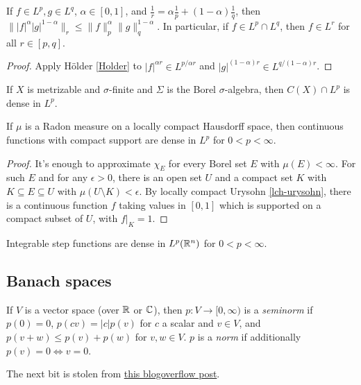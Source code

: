 \begin{prop} If $f \in L^p, g \in L^q$, $\alpha \in [0,1]$, and $\frac{1}{r} = \alpha \frac{1}{p} + (1-\alpha) \frac{1}{q}$, then $\||f|^{\alpha}|g|^{1-\alpha}\|_r \le \|f\|_p^{\alpha}\|g\|_q^{1-\alpha}$. In particular, if $f \in L^p\cap L^q$, then $f \in L^r$ for all $r \in [p,q]$.
\end{prop}
\begin{proof} Apply H\"older \ref{Holder} to $|f|^{\alpha r} \in L^{p/\alpha r}$ and $|g|^{(1-\alpha)r} \in L^{q/(1-\alpha)r}$.
\end{proof}

\begin{prop} If $X$ is metrizable and $\sigma$-finite and $\Sigma$ is the Borel $\sigma$-algebra, then $C(X) \cap L^p$ is dense in $L^p$.
\end{prop}

\begin{prop} If $\mu$ is a Radon measure on a locally compact Hausdorff space, then continuous functions with compact support are dense in $L^p$ for $0 < p < \infty$.
\end{prop}
\begin{proof} It's enough to approximate $\chi_E$ for every Borel set $E$ with $\mu(E) < \infty$. For such $E$ and for any $\epsilon > 0$, there is an open set $U$ and a compact set $K$ with $K \subseteq E \subseteq U$ with $\mu(U\setminus K) < \epsilon$. By locally compact Urysohn \ref{lch-urysohn}, there is a continuous function $f$ taking values in $[0,1]$ which is supported on a compact subset of $U$, with $f|_K = 1$.
\end{proof}

\begin{cor} Integrable step functions are dense in $L^p(\mathbb{R}^n)$ for $0 < p < \infty$.
\end{cor}


\subsection{Banach spaces}

\begin{defn} If $V$ is a vector space (over $\mathbb{R}$ or $\mathbb{C}$), then $p:V \rightarrow [0,\infty)$ is a \emph{seminorm} if $p(0) = 0$, $p(cv) = |c|p(v)$ for $c$ a scalar and $v\in V$, and $p(v+w) \le p(v) + p(w)$ for $v,w \in V$. $p$ is a \emph{norm} if additionally $p(v) = 0 \iff v = 0$.
\end{defn}

The next bit is stolen from \href{https://math.blogoverflow.com/2014/06/25/zabreikos-lemma-and-four-fundamental-theorems-of-functional-analysis/}{this blogoverflow post}.

